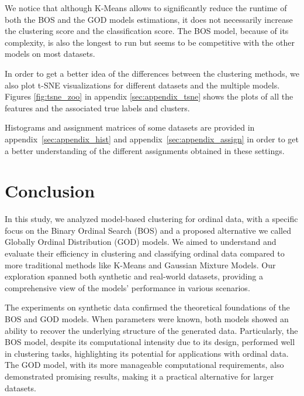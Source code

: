 \documentclass[a4paper,12pt]{article}
\newcommand{\tm}[1]{\todo[inline,color=orange!40]{{\textbf{TM:}~}#1}}
\newcommand{\ar}[1]{\todo[inline,color=green!40]{{\textbf{AR:}~}#1}}
\begin{document}
We notice that although K-Means allows to significantly reduce the runtime of both the BOS and the GOD models estimations, it does not necessarily increase the clustering score and the classification score. The BOS model, because of its complexity, is also the longest to run but seems to be competitive with the other models on most datasets.

In order to get a better idea of the differences between the clustering methods, we also plot t-SNE visualizations \citep{van2008visualizing} for different datasets and the multiple models. Figures \ref{fig:tsne_zoo} in appendix \ref{sec:appendix_tsne} shows the plots of all the features and the associated true labels and clusters.

Histograms and assignment matrices of some datasets are provided in appendix~\ref{sec:appendix_hist} and appendix~\ref{sec:appendix_assign} in order to get a better understanding of the different assignments obtained in these settings.



\section{Conclusion}
In this study, we analyzed model-based clustering for ordinal data, with a specific focus on the Binary Ordinal Search (BOS) and a proposed alternative we called Globally Ordinal Distribution (GOD) models. We aimed to understand and evaluate their efficiency in clustering and classifying ordinal data compared to more traditional methods like K-Means and Gaussian Mixture Models. Our exploration spanned both synthetic and real-world datasets, providing a comprehensive view of the models' performance in various scenarios.

The experiments on synthetic data confirmed the theoretical foundations of the BOS and GOD models. When parameters were known, both models showed an ability to recover the underlying structure of the generated data. Particularly, the BOS model, despite its computational intensity due to its design, performed well in clustering tasks, highlighting its potential for applications with ordinal data. The GOD model, with its more manageable computational requirements, also demonstrated promising results, making it a practical alternative for larger datasets.
\end{document}
